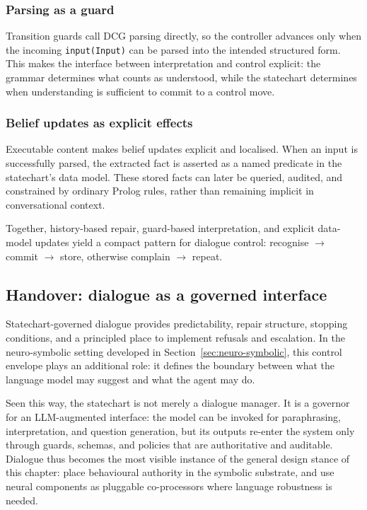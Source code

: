 \subsubsection{Parsing as a guard}

Transition guards call DCG parsing directly, so the controller advances only when the incoming \texttt{input(Input)} can be parsed into the intended structured form. This makes the interface between interpretation and control explicit: the grammar determines what counts as understood, while the statechart determines when understanding is sufficient to commit to a control move.

\subsubsection{Belief updates as explicit effects}

Executable content makes belief updates explicit and localised. When an input is successfully parsed, the extracted fact is asserted as a named predicate in the statechart's data model. These stored facts can later be queried, audited, and constrained by ordinary Prolog rules, rather than remaining implicit in conversational context.

\medskip
\noindent Together, history-based repair, guard-based interpretation, and explicit data-model updates yield a compact pattern for dialogue control: recognise \(\rightarrow\) commit \(\rightarrow\) store, otherwise complain \(\rightarrow\) repeat.

\subsection{Handover: dialogue as a governed interface}
\label{sec:ui-agents-handover}

Statechart-governed dialogue provides predictability, repair structure, stopping conditions, and a principled place to implement refusals and escalation. In the neuro-symbolic setting developed in Section~\ref{sec:neuro-symbolic}, this control envelope plays an additional role: it defines the boundary between what the language model may suggest and what the agent may do.

Seen this way, the statechart is not merely a dialogue manager. It is a governor for an LLM-augmented interface: the model can be invoked for paraphrasing, interpretation, and question generation, but its outputs re-enter the system only through guards, schemas, and policies that are authoritative and auditable. Dialogue thus becomes the most visible instance of the general design stance of this chapter: place behavioural authority in the symbolic substrate, and use neural components as pluggable co-processors where language robustness is needed.

